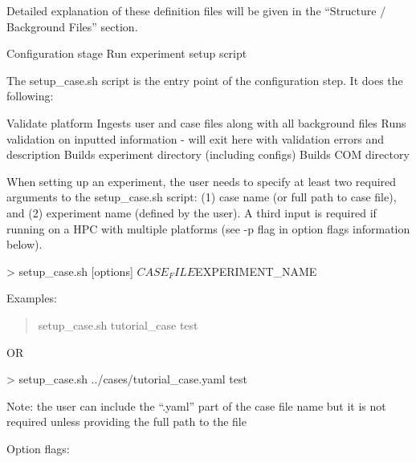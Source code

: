 Detailed explanation of these definition files will be given in the “\-Structure / Background Files” section.
\begin{DoxyEnumerate}
\item Configuration stage Run experiment setup script
\end{DoxyEnumerate}

The setup\-\_\-case.\-sh script is the entry point of the configuration step. It does the following\-:

Validate platform Ingests user and case files along with all background files Runs validation on inputted information -\/ will exit here with validation errors and description Builds experiment directory (including configs) Builds C\-O\-M directory

When setting up an experiment, the user needs to specify at least two required arguments to the setup\-\_\-case.\-sh script\-: (1) case name (or full path to case file), and (2) experiment name (defined by the user). A third input is required if running on a H\-P\-C with multiple platforms (see -\/p flag in option flags information below). \begin{DoxyVerb}> setup_case.sh [options] $CASE_FILE  $EXPERIMENT_NAME
\end{DoxyVerb}


Examples\-:

\begin{quotation}
setup\-\_\-case.\-sh tutorial\-\_\-case test

\end{quotation}


O\-R \begin{DoxyVerb}> setup_case.sh ../cases/tutorial_case.yaml test
\end{DoxyVerb}


Note\-: the user can include the “.\-yaml” part of the case file name but it is not required unless providing the full path to the file

Option flags\-:


